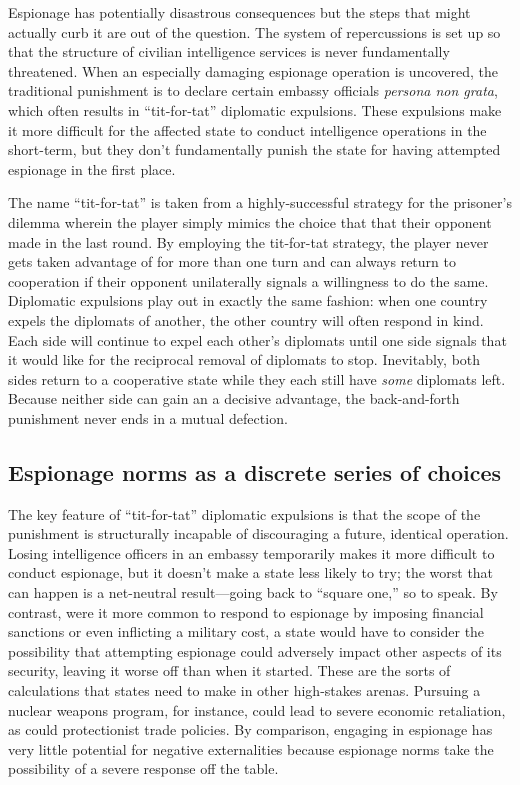 \documentclass[14pt]{extarticle}
\begin{document}
Espionage has potentially disastrous consequences but the steps that might actually curb it are out of the question. The system of repercussions is set up so that the structure of civilian intelligence services is never fundamentally threatened. When an especially damaging espionage operation is uncovered, the traditional punishment is to declare certain embassy officials \emph{persona non grata}, which often results in \enquote{tit-for-tat} diplomatic expulsions. These expulsions make it more difficult for the affected state to conduct intelligence operations in the short-term, but they don't fundamentally punish the state for having attempted espionage in the first place.

The name \enquote{tit-for-tat} is taken from a highly-successful strategy for the prisoner's dilemma wherein the player simply mimics the choice that that their opponent made in the last round. By employing the tit-for-tat strategy, the player never gets taken advantage of for more than one turn and can always return to cooperation if their opponent unilaterally signals a willingness to do the same. Diplomatic expulsions play out in exactly the same fashion: when one country expels the diplomats of another, the other country will often respond in kind. Each side will continue to expel each other's diplomats until one side signals that it would like for the reciprocal removal of diplomats to stop. Inevitably, both sides return to a cooperative state while they each still have \emph{some} diplomats left. Because neither side can gain an a decisive advantage, the back-and-forth punishment never ends in a mutual defection.

\subsection{Espionage norms as a discrete series of choices}
The key feature of \enquote{tit-for-tat} diplomatic expulsions is that the scope of the punishment is structurally incapable of discouraging a future, identical operation. Losing intelligence officers in an embassy temporarily makes it more difficult to conduct espionage, but it doesn't make a state less likely to try; the worst that can happen is a net-neutral result---going back to \enquote{square one,} so to speak. By contrast, were it more common to respond to espionage by imposing financial sanctions or even inflicting a military cost, a state would have to consider the possibility that attempting espionage could adversely impact other aspects of its security, leaving it worse off than when it started. These are the sorts of calculations that states need to make in other high-stakes arenas. Pursuing a nuclear weapons program, for instance, could lead to severe economic retaliation, as could protectionist trade policies. By comparison, engaging in espionage has very little potential for negative externalities because espionage norms take the possibility of a severe response off the table.
\end{document}
